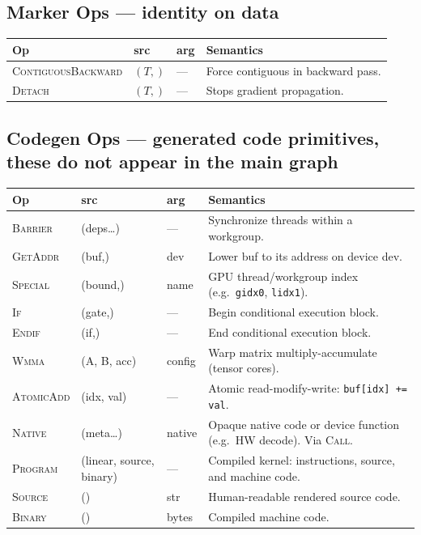 \documentclass[10pt,letterpaper]{article}
\newcommand{\op}[1]{\textsc{#1}}
\begin{document}
\subsection*{{\color{markerorange}Marker Ops} \normalfont\small--- identity on data}

\begin{tabular}{@{}l l l l@{}}
\toprule
\textbf{Op} & \textbf{src} & \textbf{arg} & \textbf{Semantics} \\
\midrule
\op{ContiguousBackward} & $(T,)$ & --- & Force contiguous in backward pass. \\
\op{Detach} & $(T,)$ & --- & Stops gradient propagation. \\
\bottomrule
\end{tabular}

\subsection*{Codegen Ops \normalfont\small--- generated code primitives, these do not appear in the main graph}

\begin{tabular}{@{}l l l l@{}}
\toprule
\textbf{Op} & \textbf{src} & \textbf{arg} & \textbf{Semantics} \\
\midrule
\op{Barrier} & (deps\ldots) & --- & Synchronize threads within a workgroup. \\
\op{GetAddr} & (buf,) & dev & Lower buf to its address on device dev. \\
\op{Special} & (bound,) & name & GPU thread/workgroup index (e.g.\ \texttt{gidx0}, \texttt{lidx1}). \\
\op{If} & (gate,) & --- & Begin conditional execution block. \\
\op{Endif} & (if,) & --- & End conditional execution block. \\
\op{Wmma} & (A, B, acc) & config & Warp matrix multiply-accumulate (tensor cores). \\
\op{AtomicAdd} & (idx, val) & --- & Atomic read-modify-write: \texttt{buf[idx] += val}. \\[4pt]
\op{Native} & (meta\ldots) & native & Opaque native code or device function (e.g.\ HW decode). Via \op{Call}. \\
\op{Program} & (linear, source, binary) & --- & Compiled kernel: instructions, source, and machine code. \\
\op{Source} & () & str & Human-readable rendered source code. \\
\op{Binary} & () & bytes & Compiled machine code. \\
\bottomrule
\end{tabular}
\end{document}
